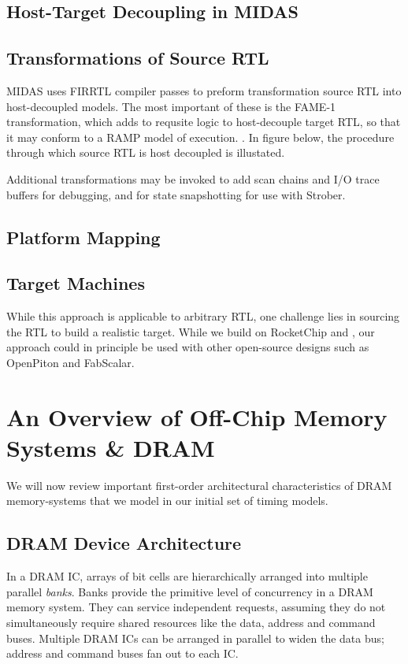 \subsection{Host-Target Decoupling in MIDAS}

\subsection{Transformations of Source RTL}

MIDAS uses FIRRTL compiler passes to preform transformation source RTL into
host-decoupled models. The most important of these is the FAME-1
transformation, which adds to requsite logic to host-decouple target RTL, so
that it may conform to a RAMP model of execution. . In figure
 below, the procedure through which source RTL is
host decoupled is illustated.


Additional transformations may be invoked to add scan
chains and I/O trace buffers for debugging, and for state snapshotting for use
with Strober\cite{strober}.

\subsection{Platform Mapping}

\subsection{Target Machines}

While this approach is applicable to arbitrary RTL, one challenge lies in
sourcing the RTL to build a realistic target. While we build on RocketChip and
\RISCV, our approach could in principle be used with other open-source designs
such as OpenPiton\cite{openpiton} and FabScalar\cite{fabscalar}.


\clearpage
\section{An Overview of Off-Chip Memory Systems \& DRAM}

We will now review important first-order architectural
characteristics of DRAM memory-systems that we model in our initial set of
timing models.

\subsection{DRAM Device Architecture}
In a DRAM IC, arrays of bit cells are hierarchically arranged into multiple
parallel \emph{banks}. Banks provide the primitive level of concurrency in a
DRAM memory system. They can service independent requests, assuming they do not
simultaneously require shared resources like the data, address and command
buses.  Multiple DRAM ICs can be arranged in parallel to widen the data bus;
address and command buses fan out to each IC.

